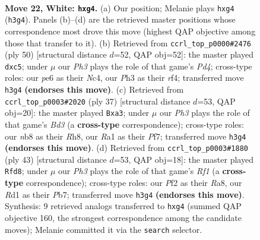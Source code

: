 \documentclass[11pt]{article}
\begin{document}
\clearpage

\begin{figure}[p]\centering
\begin{subfigure}{0.46\textwidth}\centering
\resizebox{\linewidth}{!}{%
\newchessgame
\chessboard[
  setfen={rnb1k1r1/5p2/1p2p3/p3P3/P5p1/2NB3P/1P3PP1/R2R2K1 w q - 0 22},
  showmover=false,
  pgfstyle=straightmove, color=movearrow, markmove={h3-g4}
]}
\caption{}
\end{subfigure}\hfill
\begin{subfigure}{0.46\textwidth}\centering
\resizebox{\linewidth}{!}{%
\newchessgame
\chessboard[
  setfen={r5k1/p3b1p1/4p2p/2p4P/2NPPr2/8/PP4P1/1K1R3R w - - 0 26},
  showmover=false,
  pgfstyle=straightmove, color=movearrow, markmove={d4-c5}
]}
\caption{}
\end{subfigure}
\\[4pt]
\begin{subfigure}{0.46\textwidth}\centering
\resizebox{\linewidth}{!}{%
\newchessgame
\chessboard[
  setfen={2kr3r/ppp2pp1/2nb4/3p4/6RP/N1P1P3/PP1P4/R1B1K3 b Q - 0 19},
  showmover=false,
  pgfstyle=straightmove, color=movearrow, markmove={d6-a3}
]}
\caption{}
\end{subfigure}\hfill
\begin{subfigure}{0.46\textwidth}\centering
\resizebox{\linewidth}{!}{%
\newchessgame
\chessboard[
  setfen={r4rk1/1p4p1/2p1p2p/4Pn2/pB6/P2R4/1P3PPP/2R2K2 b - - 1 22},
  showmover=false,
  pgfstyle=straightmove, color=movearrow, markmove={f8-d8}
]}
\caption{}
\end{subfigure}
\caption{\textbf{Move 22, White: \texttt{hxg4}.} (a) Our position; Melanie plays \texttt{hxg4} (\texttt{h3g4}). Panels (b)--(d) are the retrieved master positions whose correspondence most drove this move (highest QAP objective among those that transfer to it). (b) Retrieved from \texttt{ccrl\_top\_p0000\#2476} (ply 50) [structural distance $d$=52, QAP obj=52]: the master played \texttt{dxc5}; under $\mu$ our \emph{Ph3} plays the role of that game's \emph{Pd4}; cross-type roles: our \emph{p}e6 as their \emph{N}c4, our \emph{P}h3 as their \emph{r}f4; transferred move \texttt{h3g4} \textbf{(endorses this move)}. (c) Retrieved from \texttt{ccrl\_top\_p0003\#2020} (ply 37) [structural distance $d$=53, QAP obj=20]: the master played \texttt{Bxa3}; under $\mu$ our \emph{Ph3} plays the role of that game's \emph{Bd3} (a \textbf{cross-type} correspondence); cross-type roles: our \emph{n}b8 as their \emph{R}h8, our \emph{R}a1 as their \emph{P}f7; transferred move \texttt{h3g4} \textbf{(endorses this move)}. (d) Retrieved from \texttt{ccrl\_top\_p0003\#1880} (ply 43) [structural distance $d$=53, QAP obj=18]: the master played \texttt{Rfd8}; under $\mu$ our \emph{Ph3} plays the role of that game's \emph{Rf1} (a \textbf{cross-type} correspondence); cross-type roles: our \emph{P}f2 as their \emph{R}a8, our \emph{R}d1 as their \emph{P}b7; transferred move \texttt{h3g4} \textbf{(endorses this move)}. Synthesis: 9 retrieved analogs transferred to \texttt{hxg4} (summed QAP objective 160, the strongest correspondence among the candidate moves); Melanie committed it via the \texttt{search} selector.}
\label{fig:thought-m42}
\end{figure}
\end{document}

